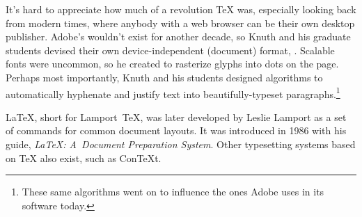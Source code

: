 It's hard to appreciate how much of a revolution \TeX{} was,
especially looking back from modern times, where anybody with a web browser
can be their own desktop publisher.
Adobe's  wouldn't exist for another decade, so Knuth
and his graduate students devised their own device-independent (document) format,
.
Scalable fonts were uncommon, so he created \MF{} to rasterize glyphs
into dots on the page.
Perhaps most importantly, Knuth and his students designed algorithms
to automatically hyphenate and justify text into
beautifully-typeset paragraphs.\punckern\footnote{These same algorithms went
on to influence the ones Adobe uses in its software today.\punckern{}}

\LaTeX{}, short for Lamport~\TeX{}, was later developed by Leslie Lamport
as a set of commands for common document layouts.
It was introduced in 1986 with his guide,
\textit{\LaTeX: A~Document Preparation System}.
Other typesetting systems based on \TeX{} also exist,
such as Con\TeX{}t.

